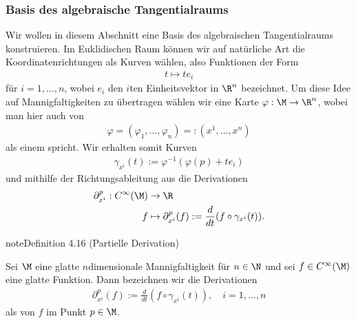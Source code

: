 \documentclass[letterpaper,10pt,english]{jupyterBook}
\begin{document}
\subsubsection{Basis des algebraische Tangentialraums}
\label{\detokenize{manifolds/tangential:basis-des-algebraische-tangentialraums}}\label{\detokenize{manifolds/tangential:sec-tpbasis}}
\sphinxAtStartPar
Wir wollen in diesem Abschnitt eine Basis des algebraischen Tangentialraums konstruieren.
Im Euklidischen Raum können wir auf natürliche Art die Koordinatenrichtungen als Kurven wählen, also Funktionen der Form
\begin{equation*}
\begin{split}t \mapsto t e_i\end{split}
\end{equation*}
\sphinxAtStartPar
für \(i=1,\ldots,n\), wobei \(e_i\) den \(i\)\sphinxhyphen{}ten Einheitsvektor in \(\R^n\) bezeichnet.
Um diese Idee auf Mannigfaltigkeiten zu übertragen wählen wir eine Karte \(\varphi:\M\to\R^n\), wobei man hier auch von
\begin{equation*}
\begin{split}\varphi = (\varphi_1,\ldots,\varphi_n) =: (x^1,\ldots,x^n)\end{split}
\end{equation*}
\sphinxAtStartPar
als einem  spricht.
Wir erhalten somit Kurven
\begin{equation*}
\begin{split}\gamma_{x^i}(t):= \varphi^{-1}(\varphi(p) + t e_i)\end{split}
\end{equation*}
\sphinxAtStartPar
und mithilfe der Richtungsableitung aus {\hyperref[\detokenize{manifolds/tangential:def:direcdiv}]{}} die Derivationen
\begin{equation*}
\begin{split}\partial_{x^i}^p: C^\infty(\M) &\to \R\\
f &\mapsto \partial_{x^i}^p(f) := \frac{d}{dt} (f\circ \gamma_{x^i}(t)).\end{split}
\end{equation*}\label{manifolds/tangential:definition-12}
\begin{sphinxadmonition}{note}{Definition 4.16 (Partielle Derivation)}



\sphinxAtStartPar
Sei \(\M\) eine glatte \(n\)\sphinxhyphen{}dimensionale Mannigfaltigkeit für \(n\in\N\) und sei \(f \in C^\infty(\M)\) eine glatte Funktion.
Dann bezeichnen wir die Derivationen
\begin{equation*}
\begin{split}\partial_{x^i}^p (f) := \frac{d}{dt} (f\circ \gamma_{x^i}(t)), \quad i=1,\ldots,n\end{split}
\end{equation*}
\sphinxAtStartPar
als  von \(f\) im Punkt \(p \in \M\).
\end{sphinxadmonition}
\end{document}
